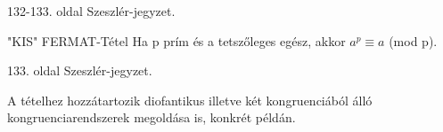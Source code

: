 \begin{bizonyitas}{}
132-133. oldal Szeszlér-jegyzet.
\end{bizonyitas}

\begin{tetel}{"KIS" FERMAT-Tétel}
Ha p prím és a tetszőleges egész, akkor $a^p \equiv a$ (mod p).
\end{tetel}

\begin{bizonyitas}{}
133. oldal Szeszlér-jegyzet.
\end{bizonyitas}

A tételhez hozzátartozik diofantikus illetve két kongruenciából álló kongruenciarendszerek megoldása is, konkrét példán.
